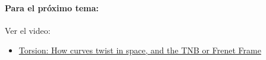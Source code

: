 \documentclass[a4,11pt]{aleph-notas}
\begin{document}
\paragraph{Para el próximo tema:}
 Ver el video:
\begin{itemize}[leftmargin=*]
    \item \href{https://youtu.be/VIqA8U9ozIA?si=G4a9bhE6ieUn622f}{Torsion: How curves twist in space, and the TNB or Frenet Frame}
\end{itemize}
\end{document}
